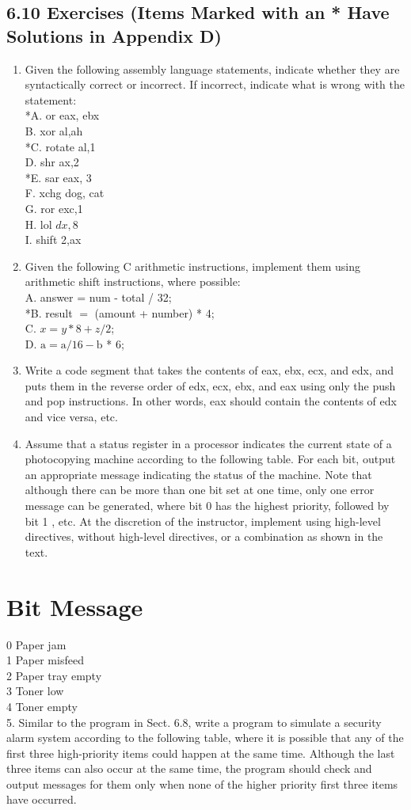 \documentclass[10pt]{article}
\begin{document}
\subsection*{6.10 Exercises (Items Marked with an * Have Solutions in Appendix D)}
\begin{enumerate}
  \item Given the following assembly language statements, indicate whether they are syntactically correct or incorrect. If incorrect, indicate what is wrong with the statement:\\
*A. or eax, ebx\\
B. xor al,ah\\
*C. rotate al,1\\
D. shr ax,2\\
*E. sar eax, 3\\
F. xchg dog, cat\\
G. ror exc,1\\
H. lol $d x, 8$\\
I. shift 2,ax
  \item Given the following C arithmetic instructions, implement them using arithmetic shift instructions, where possible:\\
A. answer = num - total / 32;\\
*B. result $=$ (amount + number) * 4;\\
C. $x=y * 8+z / 2$;\\
D. $\mathrm{a}=\mathrm{a} / 16-\mathrm{b}$ * 6;
  \item Write a code segment that takes the contents of eax, ebx, ecx, and edx, and puts them in the reverse order of edx, ecx, ebx, and eax using only the push and pop instructions. In other words, eax should contain the contents of edx and vice versa, etc.
  \item Assume that a status register in a processor indicates the current state of a photocopying machine according to the following table. For each bit, output an appropriate message indicating the status of the machine. Note that although there can be more than one bit set at one time, only one error message can be generated, where bit 0 has the highest priority, followed by bit 1 , etc. At the discretion of the instructor, implement using high-level directives, without high-level directives, or a combination as shown in the text.
\end{enumerate}

\section*{Bit Message}
0 Paper jam\\
1 Paper misfeed\\
2 Paper tray empty\\
3 Toner low\\
4 Toner empty\\
5. Similar to the program in Sect. 6.8, write a program to simulate a security alarm system according to the following table, where it is possible that any of the first three high-priority items could happen at the same time. Although the last three items can also occur at the same time, the program should check and output messages for them only when none of the higher priority first three items have occurred.
\end{document}
